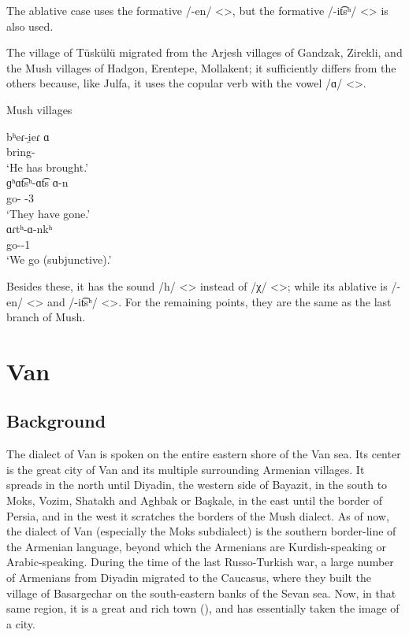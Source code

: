 The ablative case uses the formative /-en/ <>, but the formative /-it͡sʰ/ <> is also used.

The village of Tüskülü migrated from the Arjesh villages of Gandzak, Zirekli, and the Mush villages of Hadgon, Erentepe, Mollakent; it sufficiently differs from the others because, like Julfa, it uses the copular verb with the vowel /ɑ/ <>.

\begin{exe}
	\ex Mush villages \label{sent:Mush:textSample:village:Aux}
	\begin{xlist}
		\ex \gll bʰeɾ-i̯eɾ ɑ \\
		bring-{\perfcvb} {\aux} \\
		\trans `He has brought.'\\
		\ex \gll ɡʰɑt͡sʰ-ɑt͡s ɑ-n \\
		go-{\rptcp} {\aux}-3{\pl} \\
		\trans `They have gone.'\\
		\ex \gll ɑɾtʰ-ɑ-nkʰ \\
		go-{\thgloss}-1{\pl} \\
		\trans `We go (subjunctive).'\\
		
	\end{xlist}
\end{exe}


Besides these, it has the sound /h/ <> instead of /χ/ <>; while its ablative is /-en/ <> and /-it͡sʰ/ <>. For the remaining points, they are the same as the last branch of Mush. 

\fussy


\chapter{Van}\label{chapter:Van}

\section{Background}

\begin{adjarianpage}\label{page:140}\end{adjarianpage}%

The dialect of Van is spoken on the entire eastern shore of the Van sea. Its center is the great city of Van and its multiple surrounding Armenian villages. It spreads in the north until Diyadin, the western side of Bayazit, in the south to Moks, Vozim, Shatakh and Aghbak or Başkale, in the east until the border of Persia, and in the west it scratches the borders of the Mush dialect. As of now, the dialect of Van (especially the Moks subdialect) is the southern border-line of the Armenian language, beyond which the Armenians are Kurdish-speaking or Arabic-speaking. During the time of the last Russo-Turkish war, a large number of Armenians from Diyadin migrated to the Caucasus, where they built the village of Basargechar on the south-eastern banks of the Sevan sea. Now, in that same region, it is a great and rich town (), and has essentially taken the image of a city. 

